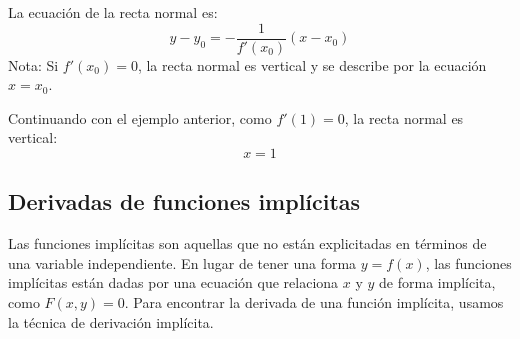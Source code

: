 La ecuación de la recta normal es:
\begin{equation}
    y - y_0 = -\frac{1}{f'(x_0)}(x - x_0)
\end{equation}
Nota: Si $f'(x_0) = 0$, la recta normal es vertical y se describe por la ecuación $x = x_0$.

\begin{example}
    Continuando con el ejemplo anterior, como $f'(1) = 0$, la recta normal es vertical:
\[
x = 1
\]
\end{example}

\begin{center}
\end{center}

\subsection{Derivadas de funciones implícitas}

Las funciones implícitas son aquellas que no están explicitadas en términos de una variable independiente. En lugar de tener una forma \( y = f(x) \), las funciones implícitas están dadas por una ecuación que relaciona \( x \) y \( y \) de forma implícita, como \( F(x, y) = 0 \). Para encontrar la derivada de una función implícita, usamos la técnica de derivación implícita.

